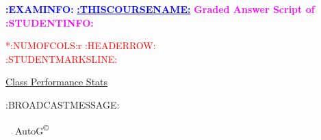 \documentclass{article}                              %
\begin{document}
%
\vspace*{1in}

\begin{center}
	\textbf{\textcolor{blue}{\LARGE :EXAMINFO:}}
	\vskip 1cm
	\textbf{\textcolor{blue}{\underline{\Large :THISCOURSENAME:}}}
	\vskip 1cm
	\textbf{\textcolor{magenta}{\LARGE Graded Answer Script of :STUDENTINFO:}}
\end{center}


\begin{center}
	\Huge 
	\textcolor{red}{
	\begin{tabular}{*{:NUMOFCOLS:}{r}}
		:HEADERROW:  \\
        	:STUDENTMARKSLINE:
	\end{tabular}
	}
        \vskip 2cm
	\large
	\underline{Class Performance Stats}
	\DTLsetseparator{;}
	\begin{table}[htbp]
		\centering
	\end{table}
	\vskip 1cm
	:BROADCASTMESSAGE:
\end{center}
\ \vfill \ \hfill \small AutoG\textsuperscript{\copyright}
\newpage
%
\end{document}
